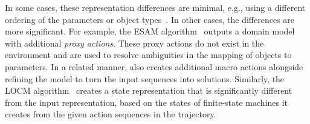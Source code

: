 In some cases, these representation differences are minimal, e.g., using a different ordering of the parameters or object types~\cite{xi2024neuro}. %
In other cases, the differences are more significant. 
For example, the ESAM algorithm~\citep{juba2021safe} outputs a domain model with additional \emph{proxy actions}. 
These proxy actions do not exist in the environment and are used to resolve ambiguities in the mapping of objects to parameters.
In a related manner, \cite{Hankui2013RefiningModels} also creates additional macro actions alongside refining the model to turn the input sequences into solutions. 
Similarly, the LOCM algorithm~\citep{cresswell2013acquiring} creates a state representation that is significantly different from the input representation, based on the states of finite-state machines it creates from the given action sequences in the trajectory. 

